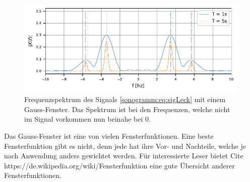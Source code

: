\begin{figure}
    \centering
    \includegraphics{papers/sonogramm/images/twoHarmGauss.pdf}
    \caption{Frequenzspektrum des Signals \eqref{sonogramm:eq:sigLeck} mit
    einem Gauss-Fenster. Das Spektrum ist bei den Frequenzen, welche nicht im Signal vorkommen
    nun beinahe bei 0.
    \label{sonogramm:twoHarmGauss}
    }
\end{figure}

Das Gauss-Fenster ist eine von vielen Fensterfunktionen. 
Eine beste Fensterfunktion gibt es nicht, denn jede hat ihre Vor- und Nachteile, welche
je nach Anwendung anders gewichtet werden.
Für interessierte Leser bietet Cite https://de.wikipedia.org/wiki/Fensterfunktion eine 
gute Übersicht anderer Fensterfunktionen.


